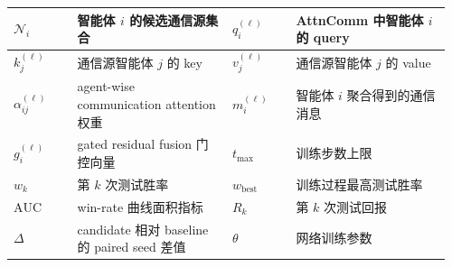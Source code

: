 {\begin{tabular}{|>{\raggedright\arraybackslash}p{0.14\linewidth}|>{\raggedright\arraybackslash}p{0.34\linewidth}|>{\raggedright\arraybackslash}p{0.14\linewidth}|>{\raggedright\arraybackslash}p{0.34\linewidth}|}
  \hline
  \(\mathcal{N}_i\) & 智能体 \(i\) 的候选通信源集合 & \(q_i^{(\ell)}\) & AttnComm 中智能体 \(i\) 的 query \\
  \hline
  \(k_j^{(\ell)}\) & 通信源智能体 \(j\) 的 key & \(v_j^{(\ell)}\) & 通信源智能体 \(j\) 的 value \\
  \hline
  \(\alpha_{ij}^{(\ell)}\) & agent-wise communication attention 权重 & \(m_i^{(\ell)}\) & 智能体 \(i\) 聚合得到的通信消息 \\
  \hline
  \(g_i^{(\ell)}\) & gated residual fusion 门控向量 & \(t_{\max}\) & 训练步数上限 \\
  \hline
  \(w_k\) & 第 \(k\) 次测试胜率 & \(w_{\mathrm{best}}\) & 训练过程最高测试胜率 \\
  \hline
  \(\mathrm{AUC}\) & win-rate 曲线面积指标 & \(R_k\) & 第 \(k\) 次测试回报 \\
  \hline
  \(\Delta\) & candidate 相对 baseline 的 paired seed 差值 & \(\theta\) & 网络训练参数 \\
  \hline
\end{tabular}%
}
\endgroup

